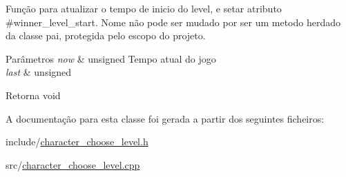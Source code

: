 Função para atualizar o tempo de inicio do level, e setar atributo \#winner\+\_\+level\+\_\+start. Nome não pode ser mudado por ser um metodo herdado da classe pai, protegida pelo escopo do projeto. 


\begin{DoxyParams}{Parâmetros}
{\em now} & unsigned Tempo atual do jogo \\
\hline
{\em last} & unsigned \\
\hline
\end{DoxyParams}
\begin{DoxyReturn}{Retorna}
void 
\end{DoxyReturn}


A documentação para esta classe foi gerada a partir dos seguintes ficheiros\+:\begin{DoxyCompactItemize}
\item 
include/\mbox{\hyperlink{character__choose__level_8h}{character\+\_\+choose\+\_\+level.\+h}}\item 
src/\mbox{\hyperlink{character__choose__level_8cpp}{character\+\_\+choose\+\_\+level.\+cpp}}\end{DoxyCompactItemize}
